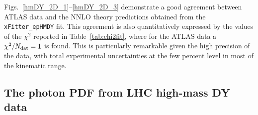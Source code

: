 Figs.~\ref{hmDY_2D_1}--\ref{hmDY_2D_3} demonstrate
a good agreement between ATLAS data and the NNLO theory
predictions obtained from the {\tt xFitter\_epHMDY} fit.
%
This agreement is also quantitatively expressed by the values of the $\chi^2$ reported in
Table~\ref{tab:chi2fit}, where for the ATLAS data a $\chi^2/N_{\rm dat}=1$ is found.
%
This is particularly remarkable
given the high precision of the data, with total experimental
uncertainties at the few percent level in most of the kinematic range.

\subsection{The photon PDF from LHC high-mass DY data}


